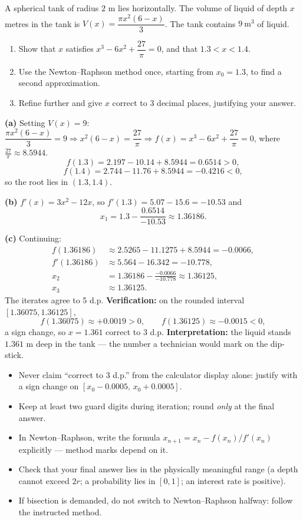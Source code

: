 \documentclass[11pt]{article}
\begin{document}
\begin{exoresolu}
A spherical tank of radius $2$ m lies horizontally. The volume of liquid of depth $x$ metres in the tank is $V(x) = \dfrac{\pi x^2(6-x)}{3}$. The tank contains $9\ \mathrm{m^3}$ of liquid.
\begin{enumerate}
\item[(a)] Show that $x$ satisfies $x^3 - 6x^2 + \dfrac{27}{\pi} = 0$, and that $1.3 < x < 1.4$.
\item[(b)] Use the Newton--Raphson method once, starting from $x_0 = 1.3$, to find a second approximation.
\item[(c)] Refine further and give $x$ correct to 3 decimal places, justifying your answer.
\end{enumerate}
\tcblower
\textbf{(a)} Setting $V(x) = 9$: $\dfrac{\pi x^2(6-x)}{3} = 9 \Rightarrow x^2(6-x) = \dfrac{27}{\pi} \Rightarrow f(x) = x^3 - 6x^2 + \dfrac{27}{\pi} = 0$, where $\frac{27}{\pi} \approx 8.5944$.
\[ f(1.3) = 2.197 - 10.14 + 8.5944 = 0.6514 > 0, \]
\[ f(1.4) = 2.744 - 11.76 + 8.5944 = -0.4216 < 0, \]
so the root lies in $(1.3, 1.4)$.

\textbf{(b)} $f'(x) = 3x^2 - 12x$, so $f'(1.3) = 5.07 - 15.6 = -10.53$ and
\[ x_1 = 1.3 - \frac{0.6514}{-10.53} \approx 1.36186. \]

\textbf{(c)} Continuing:
\begin{align*}
f(1.36186) &\approx 2.5265 - 11.1275 + 8.5944 = -0.0066, \\
f'(1.36186) &\approx 5.564 - 16.342 = -10.778, \\
x_2 &= 1.36186 - \frac{-0.0066}{-10.778} \approx 1.36125, \\
x_3 &\approx 1.36125.
\end{align*}
The iterates agree to 5 d.p. \textbf{Verification:} on the rounded interval $[1.36075, 1.36125]$,
\[ f(1.36075) \approx +0.0019 > 0, \qquad f(1.36125) \approx -0.0015 < 0, \]
a sign change, so $x = 1.361$ correct to 3 d.p. \textbf{Interpretation:} the liquid stands $1.361$ m deep in the tank --- the number a technician would mark on the dip-stick.
\end{exoresolu}

\begin{attention}
\begin{itemize}
\item Never claim ``correct to 3 d.p.'' from the calculator display alone: justify with a sign change on $[x_0 - 0.0005,\, x_0 + 0.0005]$.
\item Keep at least two guard digits during iteration; round \emph{only} at the final answer.
\item In Newton--Raphson, write the formula $x_{n+1} = x_n - f(x_n)/f'(x_n)$ explicitly --- method marks depend on it.
\item Check that your final answer lies in the physically meaningful range (a depth cannot exceed $2r$; a probability lies in $[0,1]$; an interest rate is positive).
\item If bisection is demanded, do not switch to Newton--Raphson halfway: follow the instructed method.
\end{itemize}
\end{attention}
\end{document}
